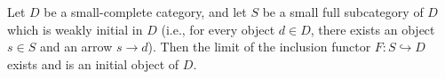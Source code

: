 Let $D$ be a small-complete category, and let $S$ be a small full subcategory of $D$ which is weakly initial in $D$ (i.e., for every object $d \in D$, there exists an object $s \in S$ and an arrow $s \to d$). Then the limit of the inclusion functor $F: S \hookrightarrow D$ exists and is an initial object of $D$.
